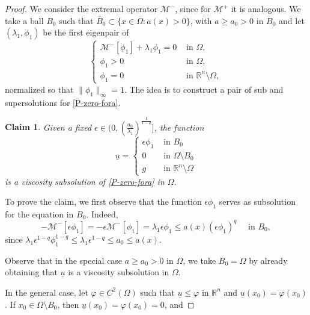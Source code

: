 \documentclass[11pt]{article}
\newtheorem{claim}{Claim}
\begin{document}
\begin{proof}
We consider the extremal operator $\mathcal{M}^-$, since for $\mathcal{M}^+$ it is analogous. 
We take a ball $B_0$ such that \(\overline{{B}}_0\subset\{x\in \Omega : a(x)>0\}\), with \(a\geq a_{0}>0\) in \({B_0}\) and let \((\lambda_{1}, \phi_{1})\) be the first eigenpair of 
\begin{equation*}
    \begin{cases}
        \mathcal{M}^{-}[\phi_1] + \lambda_{1}\phi_{1} = 0 & \text{ in } \Omega, \\
        \phi_{1} > 0 & \text{ in } \Omega, \\
        \phi_{1} = 0 & \text{ in } \mathbb{R}^{n}\setminus\Omega,
    \end{cases}
\end{equation*} 
normalized so that $\|\phi_{1}\|_{\infty}=1$. The idea is to construct a pair of sub and supersolutions for \eqref{P-zero-fora}.

\begin{claim}\label{Claim1-ex}
Given a fixed $\epsilon\in (0,  (\frac{ a_{0}}{\lambda_{1}})^{\frac{1}{1-q}}]$, the function 
    \begin{equation*}
    \underline{u} =
    \begin{cases}
        \epsilon \phi_{1} & \text{ in } B_0 \\[4pt]
        0 & \text{ in } \Omega \setminus B_0\\
         g & \text{ in } \mathbb{R}^{n} \setminus \Omega
    \end{cases}
\end{equation*}
    is a viscosity subsolution of \eqref{P-zero-fora} in \(\Omega\).
\end{claim}
 
To prove the claim, we first observe that the function \(\epsilon\phi_1\) serves as subsolution for the equation in $B_0$. Indeed, \[-\mathcal{M}^{-}[\epsilon\phi_1] = -\epsilon \mathcal{M}^{-}[\phi_1] = \lambda_{1}\epsilon \phi_{1} \leq a(x)(\epsilon \phi_{1})^{q}\quad\text{ in }B_0,\]
 since 
$\lambda_{1}\epsilon^{1-q}\phi_{1}^{1-q}\leq\lambda_{1}\epsilon^{1-q}\leq a_{0}\leq a(x).$

Observe that in the special case $a\ge a_0 >0$ in $\Omega$, we take $B_0=\Omega$ by already obtaining that $\underline{u}$ is a viscosity subsolution in $\Omega$.

In the general case, let \(\varphi \in C^{2}(\Omega)\) such that \(\underline{u}\leq \varphi\) in \(\mathbb{R}^n\) and \(\underline{u}(x_0) = \varphi(x_0)\). If \(x_0\in \Omega\setminus B_0\), then \(\underline{u}(x_0)=\varphi(x_0)=0\), and


\end{proof}
\end{document}
